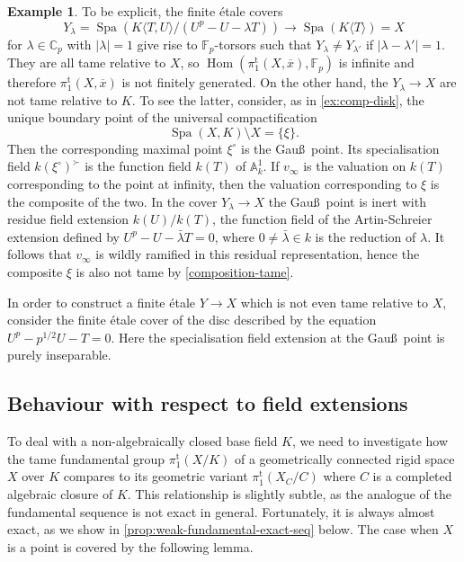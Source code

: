 \documentclass[a4paper,twoside,11pt,reqno]{amsart}
\renewcommand{\mathbb}{\mathds}
\newcommand{\bF}{{\mathbb F}}
\DeclareMathOperator{\Hom}{Hom}
\DeclareMathOperator{\Spa}{Spa}
\newcommand{\pitame}{\pi_1^{\mathrm{t}}}
\theoremstyle{definition}
\newtheorem{ex}[thm]{Example}
\numberwithin{equation}{subsection}
\begin{document}
\begin{ex}
    To be explicit, the finite \'etale covers
    \[ 
        Y_\lambda = \Spa(K\langle T, U\rangle/(U^p-U-\lambda T)) \longrightarrow \Spa(K\langle T\rangle) = X
    \]
    for $\lambda\in\mathbb{C}_p$ with $|\lambda|=1$ give rise to $\mathbb{F}_p$-torsors such that $Y_\lambda\neq Y_{\lambda'}$ if $|\lambda-\lambda'|=1$. They are all tame relative to $X$, so $\Hom(\pitame(X,\overline{x}),\bF_p)$ is infinite and therefore $\pitame(X,\overline{x})$ is not finitely generated. On the other hand, the $Y_\lambda \to X$ are not tame relative to $K$.  
    To see the latter, consider, as in \cref{ex:comp-disk}, the unique boundary point of the universal compactification 
    \[
        \Spa(X,K)\setminus X = \{\xi\}.
    \]
    Then the corresponding maximal point $\xi^\circ$ is the Gau\ss\ point. Its specialisation field $k(\xi^\circ)^\succ$ is the function field $k(T)$ of $\mathbb{A}^1_k$. If $v_\infty$ is the valuation on $k(T)$ corresponding to the point at infinity, then the valuation corresponding to $\xi$ is the composite of the two. In the cover $Y_\lambda \to X$ the Gau\ss\ point is inert with residue field extension $k(U)/k(T)$, the function field of the Artin-Schreier extension defined by $U^p-U - \bar \lambda T = 0$, where $0 \not=\bar \lambda \in k$ is the reduction of $\lambda$. It follows that $v_\infty$ is wildly ramified in this residual representation, hence the composite $\xi$ is also not tame by \cref{composition-tame}.

    In order to construct a finite \'etale $Y\to X$ which is not even tame relative to $X$, consider the finite \'etale cover of the disc described by the equation $U^p - p^{1/2}U  - T = 0$. Here the specialisation field extension at the Gau\ss\ point is purely inseparable.    
\end{ex}

\subsection{Behaviour with respect to field extensions} 
\label{ss:K-vs-C}

To deal with a non-algebraically closed base field $K$, we need to investigate how the tame fundamental group $\pitame(X/K)$ of a geometrically connected rigid space $X$ over $K$ compares to its geometric variant $\pitame(X_C/C)$ where $C$ is a completed algebraic closure of $K$. This relationship is slightly subtle, as the analogue of the fundamental sequence is not exact in general. Fortunately, it is always almost exact, as we show in \cref{prop:weak-fundamental-exact-seq} below. The case when $X$ is a point is covered by the following lemma. 
\end{document}
